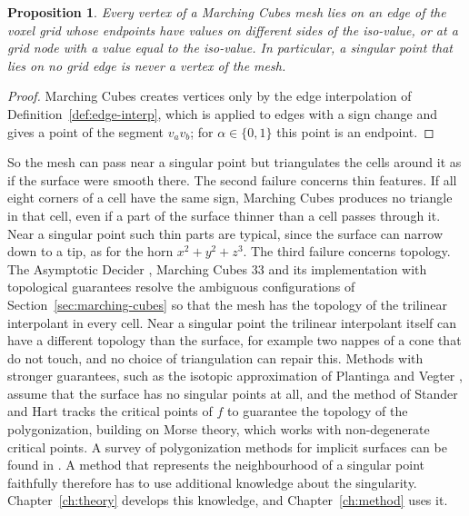 \documentclass[12pt, a4paper, oneside]{book}
\theoremstyle{plain}
\newtheorem{proposition}[theorem]{Proposition}
\theoremstyle{definition}
\theoremstyle{remark}
\theoremstyle{definition}
\begin{document}
\begin{proposition}
\label{prop:mc-vertices}
Every vertex of a Marching Cubes mesh lies on an edge of the voxel grid whose endpoints have values on different sides of the iso-value, or at a grid node with a value equal to the iso-value. In particular, a singular point that lies on no grid edge is never a vertex of the mesh.
\end{proposition}

\begin{proof}
Marching Cubes creates vertices only by the edge interpolation of Definition~\ref{def:edge-interp}, which is applied to edges with a sign change and gives a point of the segment $v_av_b$; for $\alpha\in\{0,1\}$ this point is an endpoint.
\end{proof}

So the mesh can pass near a singular point but triangulates the cells around it as if the surface were smooth there. The second failure concerns thin features. If all eight corners of a cell have the same sign, Marching Cubes produces no triangle in that cell, even if a part of the surface thinner than a cell passes through it. Near a singular point such thin parts are typical, since the surface can narrow down to a tip, as for the horn $x^2+y^2+z^3$. The third failure concerns topology. The Asymptotic Decider \cite{nielson1991asymptotic}, Marching Cubes 33 \cite{chernyaev1995marching} and its implementation with topological guarantees \cite{lewiner2003efficient} resolve the ambiguous configurations of Section~\ref{sec:marching-cubes} so that the mesh has the topology of the trilinear interpolant in every cell. Near a singular point the trilinear interpolant itself can have a different topology than the surface, for example two nappes of a cone that do not touch, and no choice of triangulation can repair this. Methods with stronger guarantees, such as the isotopic approximation of Plantinga and Vegter \cite{plantinga2004isotopic}, assume that the surface has no singular points at all, and the method of Stander and Hart \cite{stander1997guaranteeing} tracks the critical points of $f$ to guarantee the topology of the polygonization, building on Morse theory, which works with non-degenerate critical points. A survey of polygonization methods for implicit surfaces can be found in \cite{araujo2015survey}. A method that represents the neighbourhood of a singular point faithfully therefore has to use additional knowledge about the singularity. Chapter~\ref{ch:theory} develops this knowledge, and Chapter~\ref{ch:method} uses it.
\end{document}
